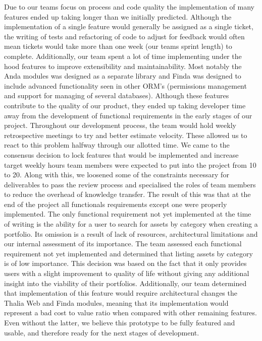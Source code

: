 \documentclass[main.tex]{subfiles}
\begin{document}
Due to our teams focus on process and code quality the implementation of many features ended up taking longer than we initially predicted. Although the implementation of a single feature would generally be assigned as a single ticket, the writing of tests and refactoring of code to adjust for feedback would often mean tickets would take more than one week (our teams sprint length) to complete. Additionally, our team spent a lot of time implementing under the hood features to improve extensibility and maintainability. Most notably the Anda modules was designed as a separate library and Finda was designed to include advanced functionality seen in other ORM’s (permissions management and support for managing of several databases). Although these features contribute to the quality of our product, they ended up taking developer time away from the development of functional requirements in the early stages of our project.
Throughout our development process, the team would hold weekly retrospective meetings to try and better estimate velocity. These allowed us to react to this problem halfway through our allotted time. We came to the consensus decision to lock features that would be implemented and increase target weekly hours team members were expected to put into the project from 10 to 20. Along with this, we loosened some of the constraints necessary for deliverables to pass the review process and specialised the roles of team members to reduce the overhead of knowledge transfer. The result of this was that at the end of the project all functionals requirements except one were properly implemented.
	The only functional requirement not yet implemented at the time of writing is the ability for a user to search for assets by category when creating a portfolio. Its omission is a result of lack of resources, architectural limitations and our internal assessment of its importance. The team assessed each functional requirement not yet implemented and determined that listing assets by category is of low importance. This decision was based on the fact that it only provides users with a slight improvement to quality of life without giving any additional insight into the viability of their portfolios. Additionally, our team determined that implementation of this feature would require architectural changes the Thalia Web and Finda modules, meaning that its implementation would represent a bad cost to value ratio when compared with other remaining features. 
	Even without the latter, we believe this prototype to be fully featured and usable, and therefore ready for the next stages of development.
\end{document}
